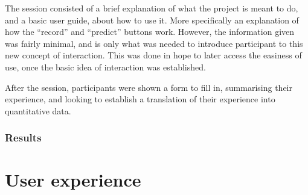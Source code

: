 The session consisted of a brief explanation of what the project is
meant to do, and a basic user guide, about how to use it. More
specifically an explanation of how the ``record'' and ``predict''
buttons work. However, the information given was fairly minimal, and
is only what was needed to introduce participant to this new concept
of interaction. This was done in hope to later access the easiness of
use, once the basic idea of interaction was established.


After the session, participants were shown a form to fill in,
summarising their experience, and looking to establish a translation
of their experience into quantitative data.

\subsubsection{Results}



% 



\section{User experience}


